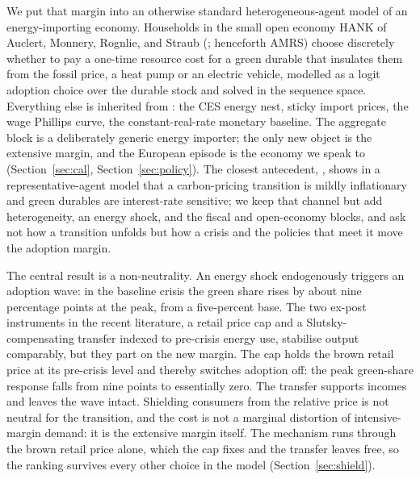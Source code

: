 We put that margin into an otherwise standard heterogeneous-agent model of an
energy-importing economy. Households in the small open economy HANK of Auclert, Monnery, Rognlie, and
Straub (\citeyear{ARS2024}; henceforth AMRS) choose discretely whether to pay a one-time resource cost for a
green durable that insulates them from the fossil price, a heat pump or an
electric vehicle, modelled as a logit adoption choice over the durable stock and
solved in the sequence space. Everything else is inherited from \citet{ARS2024}:
the CES energy nest, sticky import prices, the wage Phillips curve, the
constant-real-rate monetary baseline. The aggregate block is a deliberately generic
energy importer; the only new object is the extensive margin, and the European
episode is the economy we speak to (Section~\ref{sec:cal},
Section~\ref{sec:policy}). The closest antecedent, \citet{Dietrich2025}, shows in a
representative-agent model that a carbon-pricing transition is mildly inflationary
and green durables are interest-rate sensitive; we keep that channel but add
heterogeneity, an energy shock, and the fiscal and open-economy blocks, and ask not
how a transition unfolds but how a crisis and the policies that meet it move the
adoption margin.

The central result is a non-neutrality. An energy shock endogenously triggers an
adoption wave: in the baseline crisis the green share rises by about nine
percentage points at the peak, from a five-percent base. The two ex-post
instruments in the recent literature, a retail price cap and a
Slutsky-compensating transfer indexed to pre-crisis energy use, stabilise output
comparably, but they part on the new margin. The cap holds the brown retail price
at its pre-crisis level and thereby switches adoption off: the peak green-share
response falls from nine points to essentially zero. The transfer supports incomes
and leaves the wave intact. Shielding consumers from the relative price is not
neutral for the transition, and the cost is not a marginal distortion of
intensive-margin demand: it is the extensive margin itself. The mechanism runs
through the brown retail price alone, which the cap fixes and the transfer leaves
free, so the ranking survives every other choice in the model (Section~\ref{sec:shield}).


